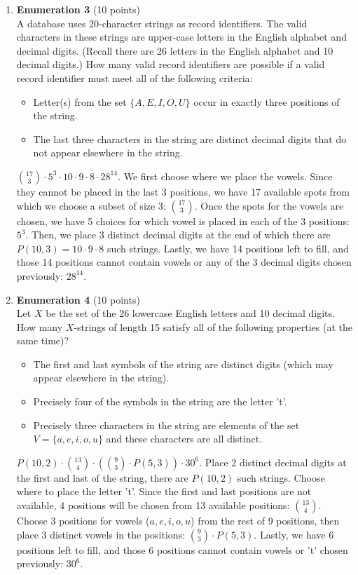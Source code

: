 \begin{enumerate}
  \item \textbf{Enumeration 3} (10 points)\\
  A database uses 20-character strings as record identifiers. The valid characters in these strings are upper-case letters in the English alphabet and decimal digits. (Recall there are 26 letters in the English alphabet and 10 decimal digits.) How many valid record identifiers are possible if a valid record identifier must meet all of the following criteria:
  \begin{itemize}
    \item Letter(s) from the set $\{A,E,I,O,U\}$ occur in exactly three positions of the string.
    \item The last three characters in the string are distinct decimal digits that do not appear elsewhere in the string.
  \end{itemize}
  \begin{subanswer}
    $\binom{17}{3} \cdot 5^3 \cdot 10 \cdot 9 \cdot 8 \cdot 28^{14}$. We first choose where we place the vowels. Since they cannot be placed in the last 3 positions, we have 17 available spots from which we choose a subset of size 3: $\binom{17}{3}$. Once the spots for the vowels are chosen, we have 5 choices for which vowel is placed in each of the 3 positions: $5^3$. Then, we place 3 distinct decimal digits at the end of which there are $P(10,3) = 10 \cdot 9 \cdot 8$ such strings. Lastly, we have 14 positions left to fill, and those 14 positions cannot contain vowels or any of the 3 decimal digits chosen previously: $28^{14}$.
  \end{subanswer}

  \item \textbf{Enumeration 4} (10 points)\\
  Let $X$ be the set of the 26 lowercase English letters and 10 decimal digits. How many $X$-strings of length 15 satisfy all of the following properties (at the same time)?
  \begin{itemize}
    \item The first and last symbols of the string are distinct digits (which may appear elsewhere in the string).
    \item Precisely four of the symbols in the string are the letter 't'.
    \item Precisely three characters in the string are elements of the set $V=\{a,e,i,o,u\}$ and these characters are all distinct.
  \end{itemize}
  \begin{subanswer}
    $P(10,2) \cdot \binom{13}{4} \cdot \left(\binom{9}{3} \cdot P(5,3)\right) \cdot 30^6$. Place 2 distinct 
    decimal digits at the first and last of the string, there are $P(10,2)$ such strings. Choose where to place 
    the letter 't'. Since the first and last positions are not available, 4 positions will be chosen from 13 
    available positions: $\binom{13}{4}$. Choose 3 positions for vowels ($a,e,i,o,u$) from the rest of 9 
    positions, then place 3 distinct vowels in the positions: $\binom{9}{3} \cdot P(5,3)$. Lastly, we have 
    6 positions left to fill, and those 6 positions cannot contain vowels or 't' chosen previously: $30^6$.
  \end{subanswer}


\end{enumerate}
